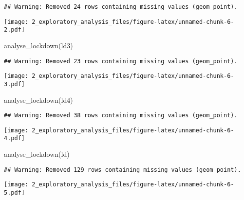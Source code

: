 \documentclass[
]{article}
\newenvironment{Shaded}{\begin{snugshade}}{\end{snugshade}}
\newcommand{\FunctionTok}[1]{\textcolor[rgb]{0.00,0.00,0.00}{#1}}
\newcommand{\NormalTok}[1]{#1}
\begin{document}
\begin{verbatim}
## Warning: Removed 24 rows containing missing values (geom_point).
\end{verbatim}

\texttt{[image: 2\_exploratory\_analysis\_files/figure-latex/unnamed-chunk-6-2.pdf]}

\begin{Shaded}
\begin{Highlighting}[]
\FunctionTok{analyse\_lockdown}\NormalTok{(ld3)}
\end{Highlighting}
\end{Shaded}

\begin{verbatim}
## Warning: Removed 23 rows containing missing values (geom_point).
\end{verbatim}

\texttt{[image: 2\_exploratory\_analysis\_files/figure-latex/unnamed-chunk-6-3.pdf]}

\begin{Shaded}
\begin{Highlighting}[]
\FunctionTok{analyse\_lockdown}\NormalTok{(ld4)}
\end{Highlighting}
\end{Shaded}

\begin{verbatim}
## Warning: Removed 38 rows containing missing values (geom_point).
\end{verbatim}

\texttt{[image: 2\_exploratory\_analysis\_files/figure-latex/unnamed-chunk-6-4.pdf]}

\begin{Shaded}
\begin{Highlighting}[]
\FunctionTok{analyse\_lockdown}\NormalTok{(ld)}
\end{Highlighting}
\end{Shaded}

\begin{verbatim}
## Warning: Removed 129 rows containing missing values (geom_point).
\end{verbatim}

\texttt{[image: 2\_exploratory\_analysis\_files/figure-latex/unnamed-chunk-6-5.pdf]}
\end{document}
